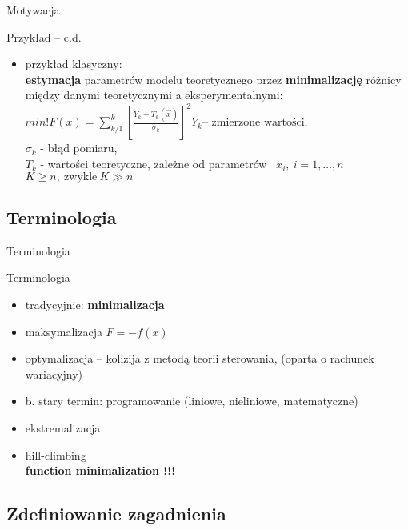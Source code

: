   \begin{frame}{Motywacja}
    \begin{exampleblock}{Przykład -- c.d.}
      \begin{itemize}
        \item przykład klasyczny:\\
        \textbf{estymacja} parametrów modelu teoretycznego
        przez \textbf{minimalizację} różnicy między danymi
        teoretycznymi a eksperymentalnymi:\\
        $
          min!F(x) = \sum_{k/1}^{k} \left[ \frac{Y_k - T_k(\vec x)}{\sigma_k}
          \right] ^2 Y_k \text{-- zmierzone wartości,}
        $ \\
        $ \sigma_k $ - błąd pomiaru,\\
        $ T_k $ - wartości teoretyczne, zależne od parametrów~
        $ x_i{,}\ i=1{,} \dots {,}n $ \\
        $ K \geq n{,}\ \text{zwykle}\ K \gg n $
      \end{itemize}
    \end{exampleblock}
  \end{frame}

\subsection{Terminologia}

  \begin{frame}{Terminologia}
    \begin{block}{Terminologia}
      \begin{itemize}
        \item tradycyjnie: \textbf{minimalizacja}
        \item maksymalizacja $ F = -f(x)$
        \item optymalizacja -- kolizija z metodą teorii
        sterowania, (oparta o rachunek wariacyjny)
        \item b. stary termin: programowanie (liniowe,
        nieliniowe, matematyczne)
        \item ekstremalizacja
        \item hill-climbing \\
        \textbf{function minimalization !!!}
      \end{itemize}
    \end{block}
  \end{frame}

\subsection{Zdefiniowanie zagadnienia}

